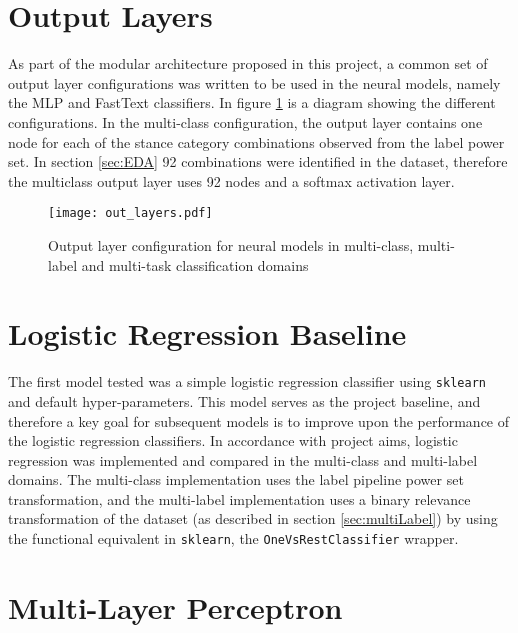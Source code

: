 \documentclass[Dissertation.tex]{subfiles}
\begin{document}
\section{Output Layers}\label{sec:outputLayers}
As part of the modular architecture proposed in this project, a common set of output layer configurations was written to be used in the neural models, namely the MLP and FastText classifiers. In figure \ref{fig:outLayers} is a diagram showing the different configurations. In the multi-class configuration, the output layer contains one node for each of the stance category combinations observed from the label power set. In section \ref{sec:EDA} 92 combinations were identified in the dataset,  therefore the multiclass output layer uses 92 nodes and a softmax activation layer.

\begin{figure}
	\centering
	\texttt{[image: out\_layers.pdf]}
	\caption{Output layer configuration for neural models in multi-class, multi-label and multi-task classification domains}
	\label{fig:outLayers}
\end{figure}

\section{Logistic Regression Baseline}
The first model tested was a simple logistic regression classifier using \texttt{sklearn} and default hyper-parameters. This model serves as the project baseline, and therefore a key goal for subsequent models is to improve upon the performance of the logistic regression classifiers. In accordance with project aims, logistic regression was implemented and compared in the multi-class and multi-label domains. The multi-class implementation uses the label pipeline power set transformation, and the multi-label implementation uses a binary relevance transformation of the dataset (as described in section \ref{sec:multiLabel}) by using the functional equivalent in \texttt{sklearn}, the \texttt{OneVsRestClassifier} wrapper.
\section{Multi-Layer Perceptron}
\end{document}
